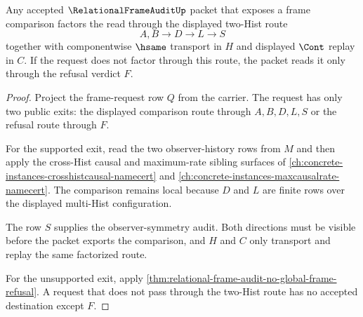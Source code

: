 \begin{theorem}
\label{thm:relational-frame-audit-observer-symmetry-factorization}
Any accepted $\RelationalFrameAuditUp$ packet that exposes a frame comparison factors the read through the displayed two-Hist route
$$
A,B \longrightarrow D \longrightarrow L \longrightarrow S
$$
together with componentwise $\hsame$ transport in $H$ and displayed $\Cont$ replay in $C$. If the request does not factor through this route, the packet reads it only through the refusal verdict $F$.
\end{theorem}
\begin{proof}
Project the frame-request row $Q$ from the carrier. The request has only two public exits: the displayed comparison route through $A,B,D,L,S$ or the refusal route through $F$.

For the supported exit, read the two observer-history rows from $M$ and then apply the cross-Hist causal and maximum-rate sibling surfaces of \autoref{ch:concrete-instances-crosshistcausal-namecert} and \autoref{ch:concrete-instances-maxcausalrate-namecert}. The comparison remains local because $D$ and $L$ are finite rows over the displayed multi-Hist configuration.

The row $S$ supplies the observer-symmetry audit. Both directions must be visible before the packet exports the comparison, and $H$ and $C$ only transport and replay the same factorized route.

For the unsupported exit, apply \autoref{thm:relational-frame-audit-no-global-frame-refusal}. A request that does not pass through the two-Hist route has no accepted destination except $F$.
\end{proof}

